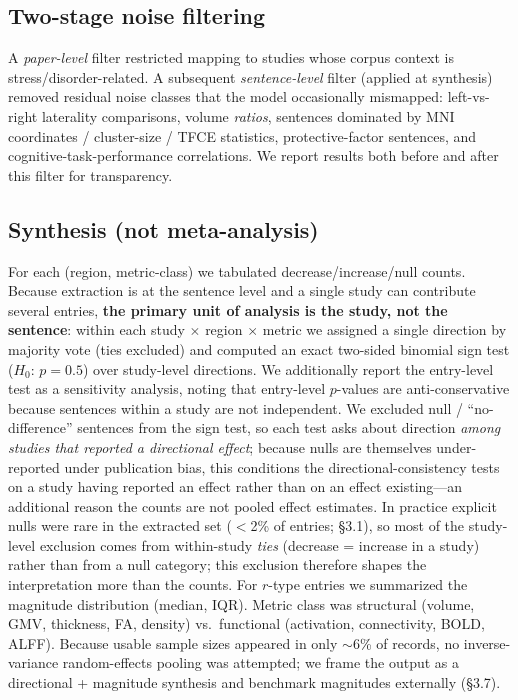 \documentclass[11pt]{article}
\begin{document}
\subsection{Two-stage noise filtering}
A \emph{paper-level} filter restricted mapping to studies whose corpus context is
stress/disorder-related. A subsequent \emph{sentence-level} filter (applied at
synthesis) removed residual noise classes that the model occasionally mismapped:
left-vs-right laterality comparisons, volume \emph{ratios}, sentences dominated by
MNI coordinates / cluster-size / TFCE statistics, protective-factor sentences,
and cognitive-task-performance correlations. We report results both before and
after this filter for transparency.

\subsection{Synthesis (not meta-analysis)}
For each (region, metric-class) we tabulated decrease/increase/null counts.
Because extraction is at the sentence level and a single study can contribute
several entries, \textbf{the primary unit of analysis is the study, not the
sentence}: within each study $\times$ region $\times$ metric we assigned a single
direction by majority vote (ties excluded) and computed an exact two-sided
binomial sign test ($H_0$: $p=0.5$) over study-level directions. We additionally
report the entry-level test as a sensitivity analysis, noting that entry-level
$p$-values are anti-conservative because sentences within a study are not
independent. We excluded null / ``no-difference'' sentences from the sign test,
so each test asks about direction \emph{among studies that reported a directional
effect}; because nulls are themselves under-reported under publication bias, this
conditions the directional-consistency tests on a study having reported an effect
rather than on an effect existing---an additional reason the counts are not
pooled effect estimates. In practice explicit nulls were rare in the extracted
set ($<$2\% of entries; \S3.1), so most of the study-level exclusion comes from
within-study \emph{ties} (decrease = increase in a study) rather than from a
null category; this exclusion therefore shapes the interpretation more than the
counts. For $r$-type entries we summarized the magnitude
distribution (median, IQR). Metric class was structural (volume, GMV, thickness,
FA, density) vs.\ functional (activation, connectivity, BOLD, ALFF). Because
usable sample sizes appeared in only $\sim$6\% of records, no inverse-variance
random-effects pooling was attempted; we frame the output as a directional +
magnitude synthesis and benchmark magnitudes externally (\S3.7).
\end{document}
